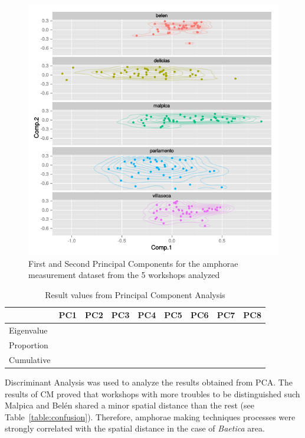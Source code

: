 \documentclass[review]{elsarticle}
\begin{document}
\begin{figure}[htp]
	\centering
\includegraphics[scale=0.45]{pca.png}
\caption{First and Second Principal Components for the amphorae measurement dataset from the 5 workshops analyzed }
\label{pca}
\end{figure} 


\begin{table}[htp]
\begin{tabular}{lcccccccc}
\hline
      		&  PC1 & PC2	& PC3 & PC4 & PC5 & PC6 & PC7 & PC8     \\ \hline
Eigenvalue  	& 	   &		&	  &  	&	  &	    &     &           \\
Proportion  & 	   &		&	  &   	&	  &	    &     &           \\
Cumulative  &       &    &     &     &     &     &     &           \\

\end{tabular}
\caption{Result values from Principal Component Analysis}
\label{table:spatgeo}
\end{table}

Discriminant Analysis was used to analyze the results obtained from PCA. The results of CM proved that workshops with more troubles to be distinguished such Malpica and Bel\'en shared a minor spatial distance than the rest (see Table~\ref{table:confusion}). Therefore, amphorae making techniques processes were strongly correlated with the spatial distance in the case of \textit{Baetica} area. 
\end{document}
